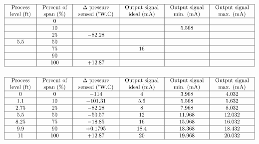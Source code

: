 $$\vbox{\offinterlineskip
\halign{\strut
\vrule \quad\hfil # \ \hfil & 
\vrule \quad\hfil # \ \hfil & 
\vrule \quad\hfil # \ \hfil & 
\vrule \quad\hfil # \ \hfil & 
\vrule \quad\hfil # \ \hfil & 
\vrule \quad\hfil # \ \hfil \vrule \cr
\noalign{\hrule}
%
Process & Percent of & $\Delta$ pressure & Output signal & Output signal & Output signal \cr
%
level (ft) & span (\%) & sensed ("W.C) & ideal (mA) & min. (mA) & max. (mA) \cr
%
\noalign{\hrule}
%
  & 0 &  &  &  &  \cr
%
\noalign{\hrule}
%
  & 10 &  &  & 5.568 &  \cr
%
\noalign{\hrule}
%
  & 25 & $-82.28$ &  &  &  \cr
%
\noalign{\hrule}
%
5.5  & 50 &  &  &  &  \cr
%
\noalign{\hrule}
%
  & 75 &  & 16 &  &  \cr
%
\noalign{\hrule}
%
  & 90 &  &  &  &  \cr
%
\noalign{\hrule}
%
  & 100 & +12.87 &  &  &  \cr
%
\noalign{\hrule}
} %
}$$ %








$$\vbox{\offinterlineskip
\halign{\strut
\vrule \quad\hfil # \ \hfil & 
\vrule \quad\hfil # \ \hfil & 
\vrule \quad\hfil # \ \hfil & 
\vrule \quad\hfil # \ \hfil & 
\vrule \quad\hfil # \ \hfil & 
\vrule \quad\hfil # \ \hfil \vrule \cr
\noalign{\hrule}
%
Process & Percent of & $\Delta$ pressure & Output signal & Output signal & Output signal \cr
%
level (ft) & span (\%) & sensed ("W.C) & ideal (mA) & min. (mA) & max. (mA) \cr
%
\noalign{\hrule}
%
0 & 0 & $-114$ & 4 & 3.968 & 4.032 \cr
%
\noalign{\hrule}
%
1.1 & 10 & $-101.31$ & 5.6 & 5.568 & 5.632 \cr
%
\noalign{\hrule}
%
2.75 & 25 & $-82.28$ & 8 & 7.968 & 8.032 \cr
%
\noalign{\hrule}
%
5.5 & 50 & $-50.57$ & 12 & 11.968 & 12.032 \cr
%
\noalign{\hrule}
%
8.25 & 75 & $-18.85$ & 16 & 15.968 & 16.032 \cr
%
\noalign{\hrule}
%
9.9 & 90 & +0.1795 & 18.4 & 18.368 & 18.432 \cr
%
\noalign{\hrule}
%
11 & 100 & +12.87 & 20 & 19.968 & 20.032 \cr
%
\noalign{\hrule}
} %
}$$ %




